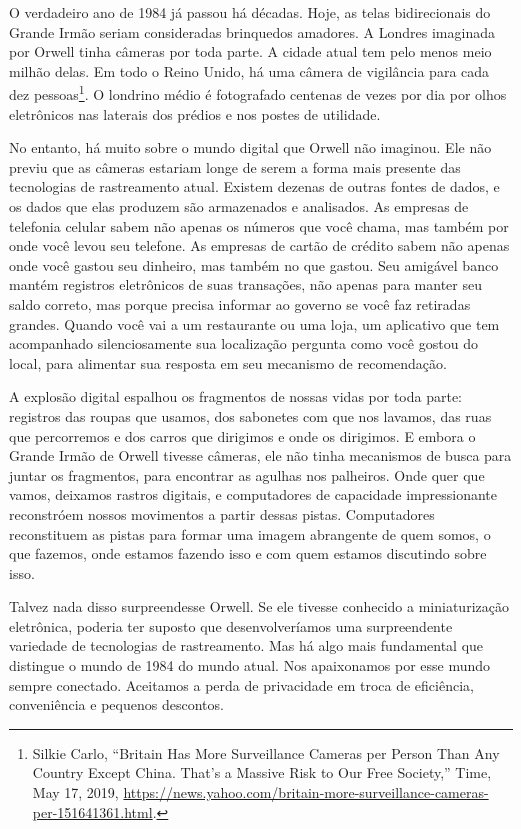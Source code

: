 O verdadeiro ano de 1984 já passou há décadas. Hoje, as telas bidirecionais do
Grande Irmão seriam consideradas brinquedos amadores. A Londres imaginada por
Orwell tinha câmeras por toda parte. A cidade atual tem pelo menos meio milhão
delas. Em todo o Reino Unido, há uma câmera de vigilância para cada dez
pessoas\footnote{Silkie Carlo, ``Britain Has More Surveillance Cameras per
Person Than Any Country Except China. That’s a Massive Risk to Our Free
Society,'' Time, May 17, 2019,
\url{https://news.yahoo.com/britain-more-surveillance-cameras-per-151641361.html}.}.
O londrino médio é fotografado centenas de vezes por dia por olhos 
eletrônicos nas laterais dos prédios e nos postes de utilidade.

No entanto, há muito sobre o mundo digital que Orwell não imaginou. Ele não
previu que as câmeras estariam longe de serem a forma mais presente das
tecnologias de rastreamento atual. Existem dezenas de outras fontes de dados, e
os dados que elas produzem são armazenados e analisados. As empresas de
telefonia celular sabem não apenas os números que você chama, mas também por
onde você levou seu telefone. As empresas de cartão de crédito sabem não apenas
onde você gastou seu dinheiro, mas também no que gastou. Seu amigável banco
mantém registros eletrônicos de suas transações, não apenas para manter seu
saldo correto, mas porque precisa informar ao governo se você faz retiradas
grandes. Quando você vai a um restaurante ou uma loja, um aplicativo que tem
acompanhado silenciosamente sua localização pergunta como você gostou do local,
para alimentar sua resposta em seu mecanismo de recomendação.

A explosão digital espalhou os fragmentos de nossas vidas por toda parte:
registros das roupas que usamos, dos sabonetes com que nos lavamos, das ruas que
percorremos e dos carros que dirigimos e onde os dirigimos. E embora o Grande
Irmão de Orwell tivesse câmeras, ele não tinha mecanismos de busca para juntar
os fragmentos, para encontrar as agulhas nos palheiros. Onde quer que vamos,
deixamos rastros digitais, e computadores de capacidade impressionante
reconstróem nossos movimentos a partir dessas pistas. Computadores reconstituem
as pistas para formar uma imagem abrangente de quem somos, o que fazemos, onde
estamos fazendo isso e com quem estamos discutindo sobre isso. 

Talvez nada disso surpreendesse Orwell. Se ele tivesse conhecido a
miniaturização eletrônica, poderia ter suposto que desenvolveríamos uma
surpreendente variedade de tecnologias de rastreamento. Mas há algo mais
fundamental que distingue o mundo de 1984 do mundo atual. Nos apaixonamos por
esse mundo sempre conectado. Aceitamos a perda de privacidade em troca de
eficiência, conveniência e pequenos descontos. 

